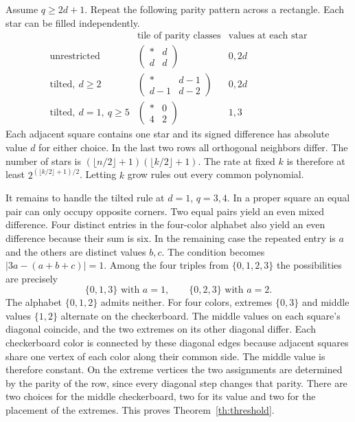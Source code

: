 \documentclass[11pt,letterpaper]{article}
\begin{document}
Assume $q\ge2d+1$. Repeat the following parity pattern across a rectangle. Each star can be filled independently.
\[
\begin{array}{c|c|c}
 &\text{tile of parity classes}&\text{values at each star}\\\hline
\text{unrestricted}&
  \left(\begin{smallmatrix} *&d\\d&d\end{smallmatrix}\right)&0,2d\\[4pt]
\text{tilted},\ d\ge2&
  \left(\begin{smallmatrix} *&d-1\\d-1&d-2\end{smallmatrix}\right)&0,2d\\[4pt]
\text{tilted},\ d=1,\ q\ge5&
  \left(\begin{smallmatrix} *&0\\4&2\end{smallmatrix}\right)&1,3
\end{array}
\]
Each adjacent square contains one star and its signed difference has absolute value $d$ for either choice. In the last two rows all orthogonal neighbors differ. The number of stars is $(\lfloor n/2\rfloor+1)(\lfloor k/2\rfloor+1)$. The rate at fixed $k$ is therefore at least $2^{(\lfloor k/2\rfloor+1)/2}$. Letting $k$ grow rules out every common polynomial.

It remains to handle the tilted rule at $d=1$, $q=3,4$. In a proper square an equal pair can only occupy opposite corners. Two equal pairs yield an even mixed difference. Four distinct entries in the four-color alphabet also yield an even difference because their sum is six. In the remaining case the repeated entry is $a$ and the others are distinct values $b,c$. The condition becomes $|3a-(a+b+c)|=1$. Among the four triples from $\{0,1,2,3\}$ the possibilities are precisely
\[
 \{0,1,3\} \text{ with } a=1,\qquad
 \{0,2,3\} \text{ with } a=2.
\]
The alphabet $\{0,1,2\}$ admits neither. For four colors, extremes $\{0,3\}$ and middle values $\{1,2\}$ alternate on the checkerboard. The middle values on each square's diagonal coincide, and the two extremes on its other diagonal differ. Each checkerboard color is connected by these diagonal edges because adjacent squares share one vertex of each color along their common side. The middle value is therefore constant. On the extreme vertices the two assignments are determined by the parity of the row, since every diagonal step changes that parity. There are two choices for the middle checkerboard, two for its value and two for the placement of the extremes. This proves Theorem~\ref{th:threshold}.
\end{document}

